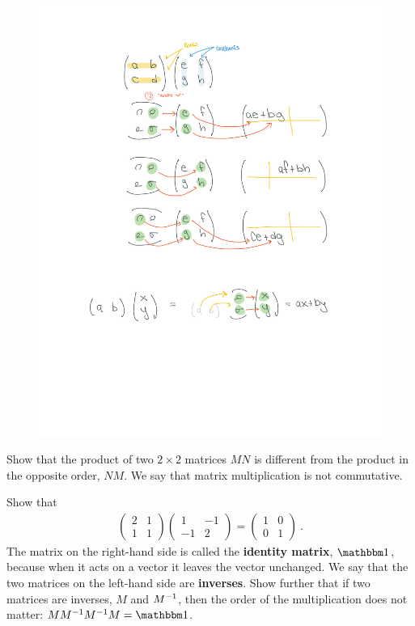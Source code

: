 \begin{figure}[ht]
    \centering
    \includegraphics[width=.8\textwidth]{figures/MatrixMult_2222b.pdf}
\end{figure}
\begin{exercise}
Show that the product of two $2\times 2$ matrices $MN$ is different from the product in the opposite order, $NM$. We say that matrix multiplication is not commutative.  
\end{exercise}
\begin{exercise}
Show that
\begin{align}
\begin{pmatrix}
    2 & 1 \\
    1 & 1 
\end{pmatrix}
\begin{pmatrix}
    1 & -1 \\
    -1 & 2 
\end{pmatrix}
=
\begin{pmatrix}
    1 & 0 \\
    0 & 1
\end{pmatrix} \ .
\end{align}
The matrix on the right-hand side is called the \textbf{identity matrix}, $\one$, because when it acts on a vector it leaves the vector unchanged. We say that the two matrices on the left-hand side are \textbf{inverses}. Show further that if two matrices are inverses, $M$ and $M^{-1}$, then the order of the multiplication does not matter: $MM\inv M\inv M = \one$.
\end{exercise}

